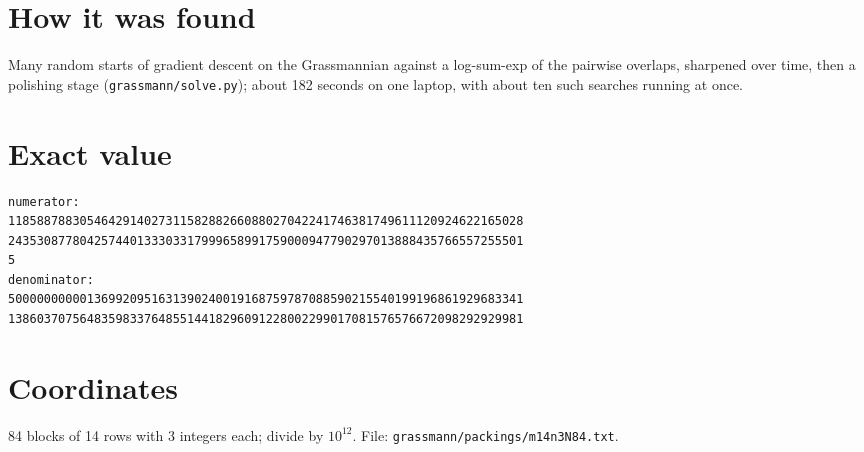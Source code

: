 \documentclass[11pt,a4paper]{article}
\begin{document}
\section{How it was found}
Many random starts of gradient descent on the Grassmannian against a log-sum-exp of the pairwise overlaps, sharpened over time, then a polishing stage (\texttt{grassmann/solve.py}); about 182 seconds on one laptop, with about ten such searches running at once.


\appendix
\section{Exact value}
{\small
\begin{verbatim}
numerator:
118588788305464291402731158288266088027042241746381749611120924622165028
243530877804257440133303317999658991759000947790297013888435766557255501
5
denominator:
500000000001369920951631390240019168759787088590215540199196861929683341
138603707564835983376485514418296091228002299017081576576672098292929981
\end{verbatim}}

\section{Coordinates}
84 blocks of 14 rows with 3 integers each; divide by $10^{12}$. File: \texttt{grassmann/packings/m14n3N84.txt}.
{\tiny
\begin{multicols}{3}
\end{multicols}}
\end{document}

